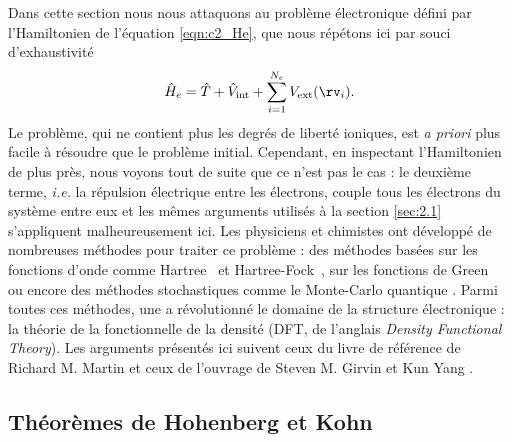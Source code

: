 Dans cette section nous nous attaquons au problème électronique défini par l'Hamiltonien de l'équation \ref{eqn:c2_He}, que nous répétons ici par souci d'exhaustivité
\begin{equation}
    \hat{H}_e = \hat{T}+\hat{V}_\text{int}+\sum_{i=1}^{N_e}V_\text{ext}(\rv_i).
\end{equation}
Le problème, qui ne contient plus les degrés de liberté ioniques, est \textit{a priori} plus facile à résoudre que le problème initial. Cependant, en inspectant l'Hamiltonien de plus près, nous voyons tout de suite que ce n'est pas le cas : le deuxième terme, \textit{i.e.} la répulsion électrique entre les électrons, couple tous les électrons du système entre eux et les mêmes arguments utilisés à la section \ref{sec:2.1} s'appliquent malheureusement ici. Les physiciens et chimistes ont développé de nombreuses méthodes pour traiter ce problème : des méthodes basées sur les fonctions d'onde comme Hartree~\cite{hartreeWaveMechanicsAtom1928,hartreeWaveMechanicsAtom1928a} et Hartree-Fock~\cite{fockNaeherungsmethodeZurLoesung1930,slaterNoteHartreesMethod1930,diracQuantumMechanicsManyelectron1929}, sur les fonctions de Green~\cite{martinTheoryManyParticleSystems1959,AbrikosovAAGorkov} ou encore des méthodes stochastiques comme le Monte-Carlo quantique \cite{ceperleyGroundStateElectron1980}. Parmi toutes ces méthodes, une a révolutionné le domaine de la structure électronique : la théorie de la fonctionnelle de la densité (DFT, de l'anglais \textit{Density Functional Theory}). Les arguments présentés ici suivent ceux du livre de référence de Richard M. Martin \cite{martinElectronicStructureBasic2004} et ceux de l'ouvrage de Steven M. Girvin et Kun Yang \cite{girvinModernCondensedMatter2019}. 

\subsection{Théorèmes de Hohenberg et Kohn}\label{sec:2.2.1}


